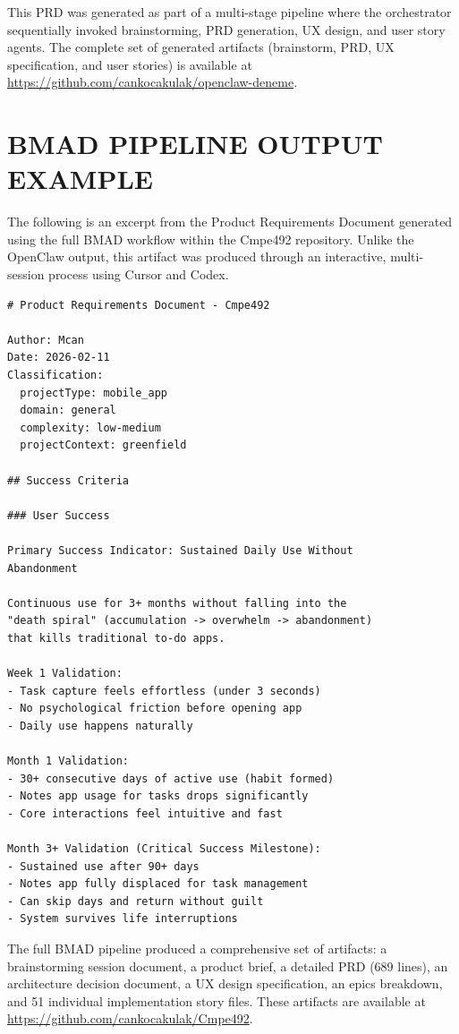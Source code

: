 \documentclass[a4paper,12pt]{report}
\begin{document}
This PRD was generated as part of a multi-stage pipeline where the orchestrator sequentially invoked brainstorming, PRD generation, UX design, and user story agents. The complete set of generated artifacts (brainstorm, PRD, UX specification, and user stories) is available at \url{https://github.com/cankocakulak/openclaw-deneme}.

\chapter{BMAD PIPELINE OUTPUT EXAMPLE}
\label{app:bmadOutput}

The following is an excerpt from the Product Requirements Document generated using the full BMAD workflow within the Cmpe492 repository. Unlike the OpenClaw output, this artifact was produced through an interactive, multi-session process using Cursor and Codex.

\begin{small}
\begin{verbatim}
# Product Requirements Document - Cmpe492

Author: Mcan
Date: 2026-02-11
Classification:
  projectType: mobile_app
  domain: general
  complexity: low-medium
  projectContext: greenfield

## Success Criteria

### User Success

Primary Success Indicator: Sustained Daily Use Without 
Abandonment

Continuous use for 3+ months without falling into the 
"death spiral" (accumulation -> overwhelm -> abandonment) 
that kills traditional to-do apps.

Week 1 Validation:
- Task capture feels effortless (under 3 seconds)
- No psychological friction before opening app
- Daily use happens naturally

Month 1 Validation:
- 30+ consecutive days of active use (habit formed)
- Notes app usage for tasks drops significantly
- Core interactions feel intuitive and fast

Month 3+ Validation (Critical Success Milestone):
- Sustained use after 90+ days
- Notes app fully displaced for task management
- Can skip days and return without guilt
- System survives life interruptions
\end{verbatim}
\end{small}

The full BMAD pipeline produced a comprehensive set of artifacts: a brainstorming session document, a product brief, a detailed PRD (689 lines), an architecture decision document, a UX design specification, an epics breakdown, and 51 individual implementation story files. These artifacts are available at \url{https://github.com/cankocakulak/Cmpe492}.
\end{document}
